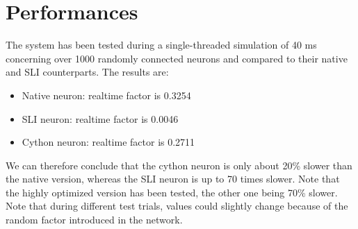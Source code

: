\documentclass{article}
\begin{document}
\section{Performances}
The system has been tested during a single-threaded simulation of 40 ms concerning over 1000 randomly connected neurons and compared to their native and SLI counterparts. The results are:
\begin{itemize}
\item Native neuron: realtime factor is 0.3254
\item SLI neuron: realtime factor is 0.0046
\item Cython neuron: realtime factor is 0.2711
\end{itemize}
We can therefore conclude that the cython neuron is only about 20\% slower than the native version, whereas the SLI neuron is up to 70 times slower. Note that the highly optimized version has been tested, the other one being 70\% slower.\\
Note that during different test trials, values could slightly change because of the random factor introduced in the network.\\
\end{document}
